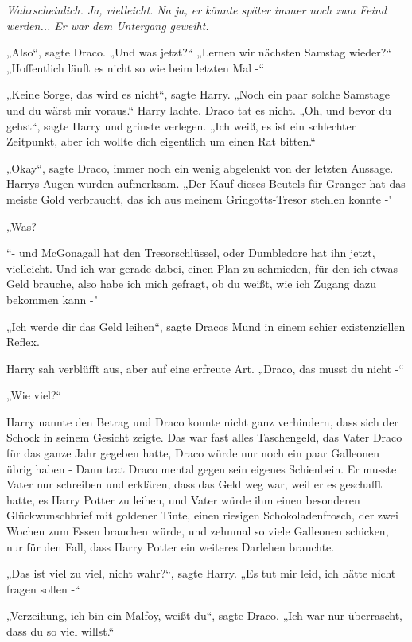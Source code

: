 {\emph{Wahrscheinlich. Ja, vielleicht. Na ja, er könnte später immer noch zum Feind werden... Er war dem Untergang geweiht.}

„Also“, sagte Draco. „Und was jetzt?“ „Lernen wir nächsten Samstag wieder?“ „Hoffentlich läuft es nicht so wie beim letzten Mal -“

„Keine Sorge, das wird es nicht“, sagte Harry. „Noch ein paar solche Samstage und du wärst mir voraus.“ Harry lachte. Draco tat es nicht. „Oh, und bevor du gehst“, sagte Harry und grinste verlegen. „Ich weiß, es ist ein schlechter Zeitpunkt, aber ich wollte dich eigentlich um einen Rat bitten.“

„Okay“, sagte Draco, immer noch ein wenig abgelenkt von der letzten Aussage. Harrys Augen wurden aufmerksam. „Der Kauf dieses Beutels für Granger hat das meiste Gold verbraucht, das ich aus meinem Gringotts-Tresor stehlen konnte -"

„Was?

“- und McGonagall hat den Tresorschlüssel, oder Dumbledore hat ihn jetzt, vielleicht. Und ich war gerade dabei, einen Plan zu schmieden, für den ich etwas Geld brauche, also habe ich mich gefragt, ob du weißt, wie ich Zugang dazu bekommen kann -"

„Ich werde dir das Geld leihen“, sagte Dracos Mund in einem schier existenziellen Reflex.

Harry sah verblüfft aus, aber auf eine erfreute Art. „Draco, das musst du nicht -“

„Wie viel?“

Harry nannte den Betrag und Draco konnte nicht ganz verhindern, dass sich der Schock in seinem Gesicht zeigte. Das war fast alles Taschengeld, das Vater Draco für das ganze Jahr gegeben hatte, Draco würde nur noch ein paar Galleonen übrig haben - Dann trat Draco mental gegen sein eigenes Schienbein. Er musste Vater nur schreiben und erklären, dass das Geld weg war, weil er es geschafft hatte, es Harry Potter zu leihen, und Vater würde ihm einen besonderen Glückwunschbrief mit goldener Tinte, einen riesigen Schokoladenfrosch, der zwei Wochen zum Essen brauchen würde, und zehnmal so viele Galleonen schicken, nur für den Fall, dass Harry Potter ein weiteres Darlehen brauchte.

„Das ist viel zu viel, nicht wahr?“, sagte Harry. „Es tut mir leid, ich hätte nicht fragen sollen -“

„Verzeihung, ich bin ein Malfoy, weißt du“, sagte Draco. „Ich war nur überrascht, dass du so viel willst.“

}
